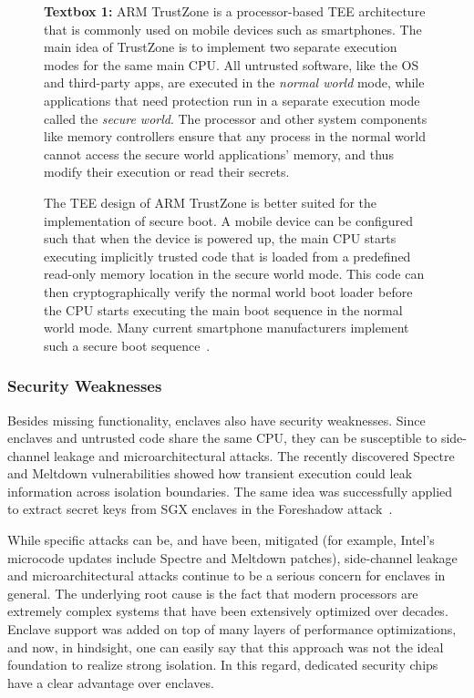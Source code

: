 \begin{figure}
    \begin{tcolorbox}
    \textbf{Textbox 1:} 
    ARM TrustZone is a processor-based TEE architecture that is commonly used on mobile devices such as smartphones. The main idea of TrustZone is to implement two separate execution modes for the same main CPU. All untrusted software, like the OS and third-party apps, are executed in the \emph{normal world} mode, while applications that need protection run in a separate execution mode called the \emph{secure world}. The processor and other system components like memory controllers ensure that any process in the normal world cannot access the secure world applications' memory, and thus modify their execution or read their secrets.
    
    \hspace{10pt} The TEE design of ARM TrustZone is better suited for the implementation of secure boot. A mobile device can be configured such that when the device is powered up, the main CPU starts executing implicitly trusted code that is loaded from a predefined read-only memory location in the secure world mode. This code can then cryptographically verify the normal world boot loader before the CPU starts executing the main boot sequence in the normal world mode. Many current smartphone manufacturers implement such a secure boot sequence~\cite{ekberg2014untapped}.
    \end{tcolorbox}
\end{figure}  


\subsubsection*{Security Weaknesses}

Besides missing functionality, enclaves also have security weaknesses. Since enclaves and untrusted code share the same CPU, they can be susceptible to side-channel leakage and microarchitectural attacks. The recently discovered Spectre and Meltdown vulnerabilities showed how transient execution could leak information across isolation boundaries. The same idea was successfully applied to extract secret keys from SGX enclaves in the Foreshadow attack~\cite{van2018foreshadow}. 

While specific attacks can be, and have been, mitigated (for example, Intel's microcode updates include Spectre and Meltdown patches), side-channel leakage and microarchitectural attacks continue to be a serious concern for enclaves in general. The underlying root cause is the fact that modern processors are extremely complex systems that have been extensively optimized over decades. Enclave support was added on top of many layers of performance optimizations, and now, in hindsight, one can easily say that this approach was not the ideal foundation to realize strong isolation. In this regard, dedicated security chips have a clear advantage over enclaves.

